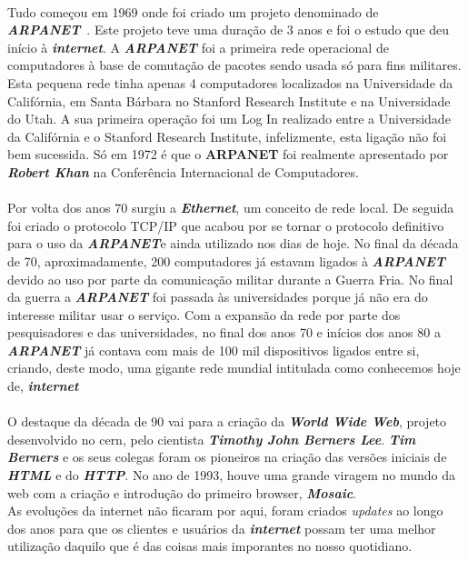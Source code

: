 \documentclass{report}
\begin{document}
\paragraph{}
Tudo começou em 1969 onde foi criado um projeto denominado de \textbf{\textit{ARPANET}}~\cite{ARPANET}. Este projeto teve uma duração de 3 anos e foi o estudo que deu início à \textbf{\textit{internet}}. A \textbf{\textit{ARPANET}} foi a primeira rede operacional de computadores à base de comutação de pacotes sendo usada só para fins militares. Esta pequena rede tinha apenas 4 computadores localizados na Universidade da Califórnia, em Santa Bárbara no Stanford Research Institute e na Universidade do Utah. A sua primeira operação foi um Log In realizado entre a Universidade da Califórnia e o Stanford Research Institute, infelizmente, esta ligação não foi bem sucessida. Só em 1972 é que o \textbf{ARPANET} foi realmente apresentado por \textbf{\textit{Robert Khan}} na Conferência Internacional de Computadores. 
\paragraph{}
Por volta dos anos 70 surgiu a \textbf{\textit{Ethernet}}, um conceito de rede local. De seguida foi criado o protocolo TCP/IP que acabou por se tornar o protocolo definitivo para o uso da \textbf{\textit{ARPANET}}e ainda utilizado nos dias de hoje. 
No final da década de 70, aproximadamente, 200 computadores já estavam ligados à \textbf{\textit{ARPANET}} devido ao uso por parte da comunicação militar durante a Guerra Fria. No final da guerra a \textbf{\textit{ARPANET}} foi passada às universidades porque já não era do interesse militar usar o serviço. Com a expansão da rede por parte dos pesquisadores e das universidades, no final dos anos 70 e inícios dos anos 80 a \textbf{\textit{ARPANET}} já contava com mais de 100 mil dispositivos ligados entre si, criando, deste modo, uma gigante rede mundial intitulada como conhecemos hoje de, \textbf{\textit{internet}}
\paragraph{}
O destaque da década de 90 vai para a criação da \textbf{\textit{World Wide Web}}, projeto desenvolvido no \acs{cern}, pelo cientista \textbf{\textit{Timothy John Berners Lee}}.
\textbf{\textit{Tim Berners}} e os seus colegas foram os pioneiros na criação das versões iniciais de \textbf{\textit{HTML}} e do \textbf{\textit{HTTP}}. No ano de 1993, houve uma grande viragem no mundo da web com a criação e introdução do primeiro browser, \textbf{\textit{Mosaic}}.\\As evoluções da internet não ficaram por aqui, foram criados \textit{updates} ao longo dos anos para que os clientes e usuários da \textbf{\textit{internet}} possam ter uma melhor utilização daquilo que é das coisas mais imporantes no nosso quotidiano. 
\end{document}
